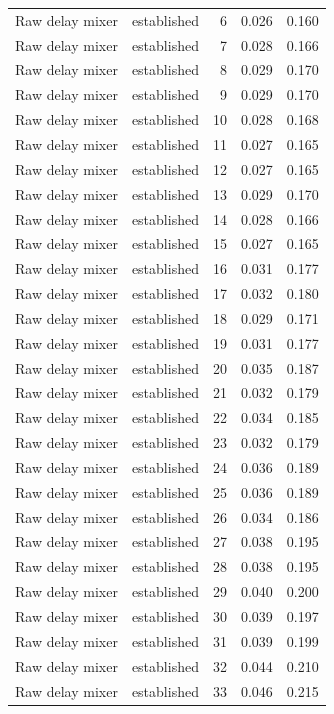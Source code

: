 \begin{tabular}{llrrr}
Raw delay mixer & established & 6 & 0.026 & 0.160 \\
Raw delay mixer & established & 7 & 0.028 & 0.166 \\
Raw delay mixer & established & 8 & 0.029 & 0.170 \\
Raw delay mixer & established & 9 & 0.029 & 0.170 \\
Raw delay mixer & established & 10 & 0.028 & 0.168 \\
Raw delay mixer & established & 11 & 0.027 & 0.165 \\
Raw delay mixer & established & 12 & 0.027 & 0.165 \\
Raw delay mixer & established & 13 & 0.029 & 0.170 \\
Raw delay mixer & established & 14 & 0.028 & 0.166 \\
Raw delay mixer & established & 15 & 0.027 & 0.165 \\
Raw delay mixer & established & 16 & 0.031 & 0.177 \\
Raw delay mixer & established & 17 & 0.032 & 0.180 \\
Raw delay mixer & established & 18 & 0.029 & 0.171 \\
Raw delay mixer & established & 19 & 0.031 & 0.177 \\
Raw delay mixer & established & 20 & 0.035 & 0.187 \\
Raw delay mixer & established & 21 & 0.032 & 0.179 \\
Raw delay mixer & established & 22 & 0.034 & 0.185 \\
Raw delay mixer & established & 23 & 0.032 & 0.179 \\
Raw delay mixer & established & 24 & 0.036 & 0.189 \\
Raw delay mixer & established & 25 & 0.036 & 0.189 \\
Raw delay mixer & established & 26 & 0.034 & 0.186 \\
Raw delay mixer & established & 27 & 0.038 & 0.195 \\
Raw delay mixer & established & 28 & 0.038 & 0.195 \\
Raw delay mixer & established & 29 & 0.040 & 0.200 \\
Raw delay mixer & established & 30 & 0.039 & 0.197 \\
Raw delay mixer & established & 31 & 0.039 & 0.199 \\
Raw delay mixer & established & 32 & 0.044 & 0.210 \\
Raw delay mixer & established & 33 & 0.046 & 0.215 \\

\end{tabular}
